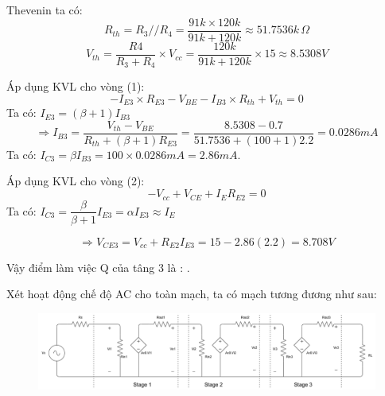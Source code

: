 \begin{itemize}[label=-]
		Thevenin ta có:
		\[ R_{th} = R_{3}//R_{4} = \dfrac{91k \times 120k}{91k + 120k} \approx 51.7536k \,\Omega \]
		\[ V_{th} = \dfrac{R4}{R_{3} + R_{4}}\times V_{cc} = \dfrac{120k}{91k + 120k}\times 15 \approx 8.5308V\]
		
		Áp dụng KVL cho vòng (1):
		\[ -I_{E3}\times R_{E3} - V_{BE} - I_{B3}\times R_{th} + V_{th} = 0 \]
		Ta có: $I_{E3} = (\beta + 1) I_{B3}$
		\[ \Rightarrow I_{B3} = \dfrac{V_{th} - V_{BE}}{R_{th} + (\beta + 1)R_{E3}} = \dfrac{8.5308 - 0.7}{51.7536 + (100+1)2.2} = 0.0286mA\]
		Ta có: $I_{C3} = \beta I_{B3} = 100\times 0.0286mA = 2.86mA$.
		
		Áp dụng KVL cho vòng (2):
		\[-V_{cc} + V_{CE} + I_{E}R_{E2} = 0 \]
		Ta có: $I_{C3} = \dfrac{\beta}{\beta + 1}I_{E3} = \alpha I_{E3} \approx I_{E}$
		
		\[ \Rightarrow V_{CE3} = V_{cc} + R_{E2}I_{E3} = 15 - 2.86(2.2) = 8.708V\]
		
		Vậy điểm làm việc Q của tâng 3 là : .
\end{itemize}


\noindent Xét hoạt động chế độ AC cho toàn mạch, ta có mạch tương đương như sau:

\begin{figure}[H]
	\centering
	\includegraphics[width=.9\linewidth]{./my-chapters/my-diagrams/Question6/caub_tongquat.png}
\end{figure}

